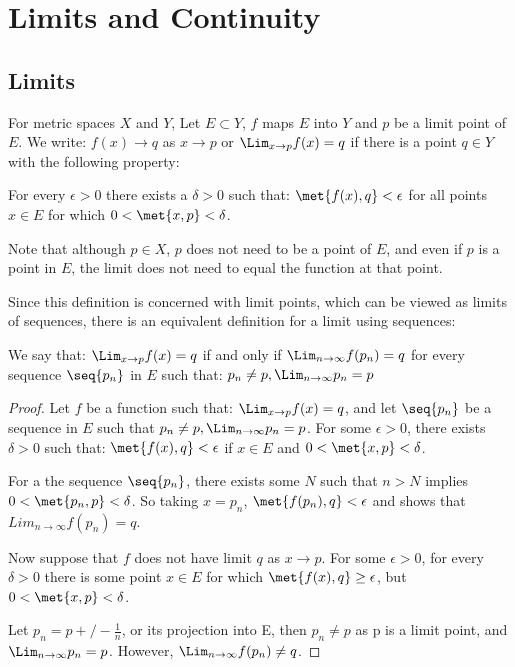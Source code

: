 \documentclass[12pt, letterpaper]{paper}
\begin{document}
\section{Limits and Continuity}

\subsection{Limits}

For metric spaces $X$ and $Y$, Let $E \subset Y$, $f$ maps $E$ into
$Y$ and $p$ be a limit point of $E$. We write: $f(x) \to q$ as
$x \to p$ or $\Lim_{x\to p}f(x) = q$ if there is a point $q \in Y$
with the following property:

For every $\epsilon > 0$ there exists a $\delta > 0$ such that:
$\met{ f(x), q } < \epsilon$ for all points $x \in E$ for which
$0 < \met{ x, p } < \delta$.

Note that although $p \in X$, $p$ does not need to be a point of $E$,
and even if $p$ is a point in $E$, the limit does not need to equal
the function at that point.

Since this definition is concerned with limit points, which can be
viewed as limits of sequences, there is an equivalent definition for a
limit using sequences:

We say that: $\Lim_{x\to p}f(x) = q$ if and only if
$\Lim_{n \to \infty} f( p_n ) = q$ for every sequence $\seq{p_n}$ in
$E$ such that: $p_n \neq p, \Lim_{n \to \infty}p_n = p$

\begin{proof}
  Let $f$ be a function such that: $\Lim_{x\to p} f(x) = q$, and let
  $\seq{p_n}$ be a sequence in $E$ such that
  $p_n \neq p, \Lim_{n\to \infty}p_n = p$. For some $\epsilon>0$,
  there exists $\delta > 0$ such that: $\met{f(x),q} < \epsilon$ if
  $x \in E$ and $0 < \met{x,p} < \delta$.

  For a the sequence $\seq{p_n}$, there exists some $N$ such that
  $n > N$ implies $0 < \met{p_n,p} < \delta$. So taking $x = p_n$,
  $\met{f(p_n), q} < \epsilon$ and shows that
  $Lim_{n\to\infty}f(p_n) = q$.

  Now suppose that $f$ does not have limit $q$ as $x \to p$. For some
  $\epsilon > 0$, for every $\delta > 0$ there is some point $x \in E$
  for which $\met{f(x),q} \geq \epsilon$, but
  $0 < \met{x,p} < \delta$.

  Let $p_n = p +/- \frac{1}{n}$, or its projection into E, then
  $p_n \neq p$ as p is a limit point, and $\Lim_{n\to \infty}p_n =
  p$. However, $\Lim_{n\to\infty} f( p_n ) \neq q$.
\end{proof}
\end{document}
